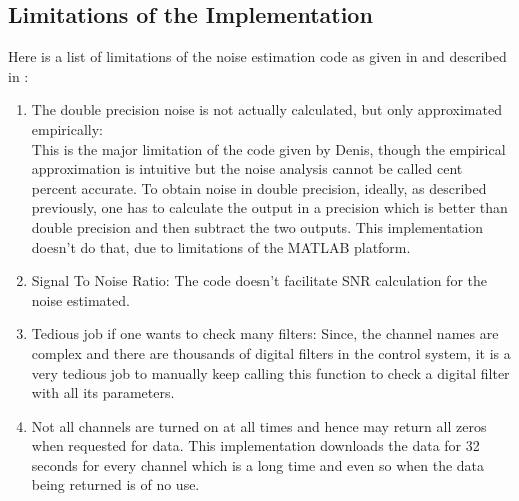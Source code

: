 \documentclass[colorlinks=true,pdfstartview=FitV,linkcolor=blue,
            citecolor=red,urlcolor=magenta]{ligodoc}
\begin{document}
	\subsection{Limitations of the Implementation}
	Here is a list of limitations of the noise estimation code as given in \cite{dencode} and described in \cite{thesis}:
	\begin{enumerate}
			\item The double precision noise is not actually calculated, but only approximated empirically: \\ 
				This is the major limitation of the code given by Denis, though the empirical approximation is intuitive but the noise analysis cannot be called cent percent accurate. To obtain noise in double precision, ideally, as described previously, one has to calculate the output in a precision which is better than double precision and then subtract the two outputs. This implementation doesn't do that, due to limitations of the MATLAB platform.
				
			\item Signal To Noise Ratio: The code \cite{dencode} doesn't facilitate SNR calculation for the noise estimated. 
			\item Tedious job if one wants to check many filters: Since, the channel names are complex and there are thousands of digital filters in the control system, it is a very tedious job to manually keep calling this function to check a digital filter with all its parameters. 
			\item Not all channels are turned on at all times and hence may return all zeros when requested for data. This implementation downloads the data for 32 seconds for every channel which is a long time and even so when the data being returned is of no use. 
	\end{enumerate}
\end{document}
